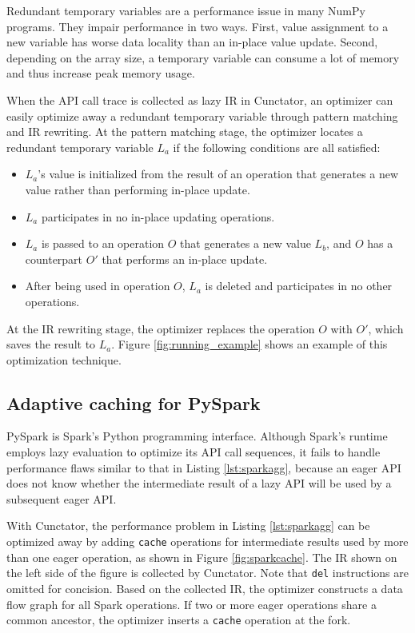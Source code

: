 \documentclass[sigconf]{acmart}\settopmatter{printfolios=true,printccs=false,printacmref=false}\setcopyright{none}
\begin{document}
Redundant temporary variables are a performance issue in many NumPy programs. 
They impair performance in two ways. First, value assignment to a new variable has worse data locality than an in-place value update. Second, depending on the array size, a temporary variable can consume a lot of memory and thus increase peak memory usage.

When the API call trace is collected as lazy IR in Cunctator, an optimizer can easily optimize away a redundant temporary variable through pattern matching and IR rewriting. At the pattern matching stage, the optimizer locates a redundant temporary variable $L_a$ if the following conditions are all satisfied:
\begin{itemize}
    \item $L_a$'s value is initialized from the result of an operation that generates a new value rather than performing in-place update.
    \item $L_a$ participates in no in-place updating operations.
    \item $L_a$ is passed to an operation $O$ that generates a new value $L_b$, and $O$ has a counterpart $O'$ that performs an in-place update.
    \item After being used in operation $O$, $L_a$ is deleted and participates in no other operations.
\end{itemize}
At the IR rewriting stage, the optimizer replaces the operation $O$ with $O'$, which saves the result to $L_a$. Figure \ref{fig:running_example} shows an example of this optimization technique.

\subsection{Adaptive caching for PySpark}

\label{sec:sparkcache}


PySpark is Spark's Python programming interface. Although Spark's runtime employs lazy evaluation to optimize its API call sequences, it fails to handle performance flaws similar to that in Listing \ref{lst:sparkagg}, because an eager API does not know whether the intermediate result of a lazy API will be used by a subsequent eager API.

With Cunctator, the performance problem in Listing \ref{lst:sparkagg} can be optimized away by adding \texttt{cache} operations for intermediate results used by more than one eager operation, as shown in Figure \ref{fig:sparkcache}. The IR shown on the left side of the figure is collected by Cunctator. Note that \texttt{del} instructions are omitted for concision. Based on the collected IR, the optimizer constructs a data flow graph for all Spark operations. If two or more eager operations share a common ancestor, the optimizer inserts a \texttt{cache} operation at the fork.
\end{document}
